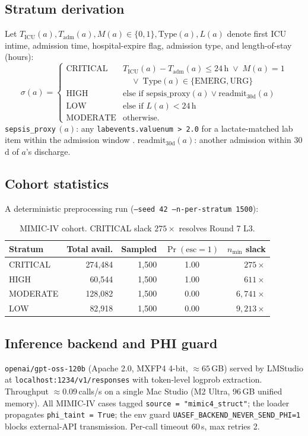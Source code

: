 \documentclass[11pt,letterpaper]{article}
\begin{document}
\subsection{Stratum derivation}\label{sec:stratum}
Let $T_{\text{ICU}}(a), T_{\text{adm}}(a), M(a) \in \{0,1\}, \mathrm{Type}(a),
L(a)$ denote first ICU intime, admission time, hospital-expire flag,
admission type, and length-of-stay (hours):
\[
\sigma(a) =
\begin{cases}
\text{CRITICAL} & T_{\text{ICU}}(a) - T_{\text{adm}}(a) \le 24\,\text{h} \;\lor\; M(a) = 1 \\
& \quad\lor\; \mathrm{Type}(a) \in \{\text{EMERG}, \text{URG}\} \\
\text{HIGH} & \text{else if } \mathrm{sepsis\_proxy}(a) \lor \mathrm{readmit}_{30\text{d}}(a) \\
\text{LOW} & \text{else if } L(a) < 24\,\text{h} \\
\text{MODERATE} & \text{otherwise.}
\end{cases}
\]
\texttt{sepsis\_proxy}\,$(a)$: any \texttt{labevents.valuenum > 2.0} for a
lactate-matched lab item within the admission window
\cite{Singer2016Sepsis3}.
$\mathrm{readmit}_{30\text{d}}(a)$: another admission within 30\,d of
$a$'s discharge.

\subsection{Cohort statistics}
A deterministic preprocessing run (\texttt{--seed 42 --n-per-stratum 1500}):

\begin{table}[h!]
\centering
\caption{MIMIC-IV cohort. CRITICAL slack $275\times$ resolves Round 7 L3.}
\begin{tabular}{lrrcr}
\toprule
Stratum & Total avail. & Sampled & $\Pr(\text{esc}=1)$ & $n_{\min}$ slack \\
\midrule
CRITICAL & 274{,}484 & 1{,}500 & 1.00 & $275\times$ \\
HIGH & 60{,}544 & 1{,}500 & 1.00 & $611\times$ \\
MODERATE & 128{,}082 & 1{,}500 & 0.00 & $6{,}741\times$ \\
LOW & 82{,}918 & 1{,}500 & 0.00 & $9{,}213\times$ \\
\bottomrule
\end{tabular}
\end{table}

\subsection{Inference backend and PHI guard}
\texttt{openai/gpt-oss-120b} \cite{GptOss2025} (Apache 2.0, MXFP4 4-bit,
$\approx 65$\,GB) served by LMStudio at \texttt{localhost:1234/v1/responses}
with token-level logprob extraction. Throughput $\approx 0.09$\,calls/s on
a single Mac Studio (M2 Ultra, 96\,GB unified memory). All MIMIC-IV cases
tagged \texttt{source = "mimic4\_struct"}; the loader propagates
\texttt{phi\_taint = True}; the env guard
\texttt{UASEF\_BACKEND\_NEVER\_SEND\_PHI=1} blocks external-API
transmission. Per-call timeout 60\,s, max retries 2.
\end{document}
